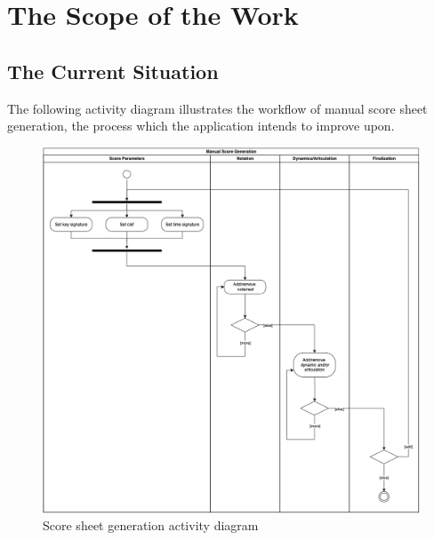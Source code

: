 \documentclass[12pt]{article}
\begin{document}
\section{The Scope of the Work}
\subsection{The Current Situation}
The following activity diagram illustrates the workflow of manual score sheet generation, the process
which the application intends to improve upon.
\begin{figure}[H]
  \includegraphics[width=\textwidth]{SRS-manual-score-process-revised.png}
  \caption{Score sheet generation activity diagram}
\end{figure}
\end{document}
